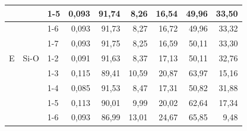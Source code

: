 \documentclass[
  digital, %
  table,   %
  lof,     %
  lot,     %
  oneside,
]{fithesis3}
\begin{document}
\begin{table}
\begin{minipage}{\textwidth}
\begin{center}
\begin{tabular}{|l|l|l|r|r|r|r|r|r|}
 &  & 1-5  & 0,093 & 91,74   & 8,26   & 16,54   & 49,96   & 33,50   \\ \hline
 &  & 1-6 & 0,093 & 91,73   & 8,27   & 16,72   & 49,96   & 33,32   \\ \hline
 &  & 1-7 & 0,093 & 91,75   & 8,25   & 16,59   & 50,11   & 33,30   \\ \hline
E & Si-O & 1-2  & 0,091 & 91,63   & 8,37   & 17,13   & 50,11   & 32,76   \\ \hline
 &  & 1-3  & 0,115 & 89,41   & 10,59   & 20,87   & 63,97   & 15,16   \\ \hline
 &  & 1-4  & 0,085 & 91,53   & 8,47   & 17,31   & 50,82   & 31,88   \\ \hline
 &  & 1-5  & 0,113 & 90,01   & 9,99   & 20,02   & 62,64   & 17,34   \\ \hline
 &  & 1-6 & 0,093 & 86,99   & 13,01   & 24,67   & 65,85   & 9,48   \\ \hline
\end{tabular}\end{center}\end{minipage}\end{table}
\end{document}
